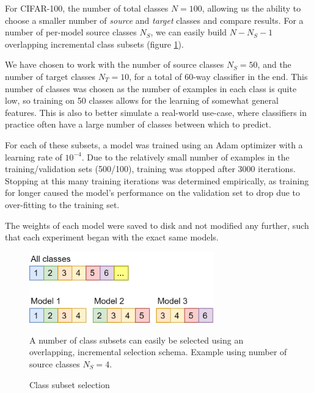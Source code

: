\documentclass{report}
\begin{document}
	For CIFAR-100, the number of total classes $N=100$, allowing us the ability to choose a smaller number of \emph{source} and \emph{target} classes and compare results. For a number of per-model source classes $N_S$, we can easily build $N-N_S-1$ overlapping incremental class subsets (figure \ref{fig:subsets:1}). \par
	We have chosen to work with the number of source classes $N_S = 50$, and the number of target classes $N_T = 10$, for a total of 60-way classifier in the end. This number of classes was chosen as the number of examples in each class is quite low, so training on 50 classes allows for the learning of somewhat general features. This is also to better simulate a real-world use-case, where classifiers in practice often have a large number of classes between which to predict. \par
	For each of these subsets, a model was trained using an Adam optimizer with a learning rate of $10^{-4}$. Due to the relatively small number of examples in the training/validation sets (500/100), training was stopped after 3000 iterations. Stopping at this many training iterations was determined empirically, as training for longer caused the model's performance on the validation set to drop due to over-fitting to the training set. \par
	The weights of each model were saved to disk and not modified any further, such that each experiment began with the exact same models. \par
	\begin{figure}[h]
		\centering
		\includegraphics[width=8cm]{modelsubsets}
		\caption{Class subset selection}
		A number of class subsets can easily be selected using an overlapping, incremental selection schema. Example using number of source classes $N_S = 4$.
		\label{fig:subsets:1}
	\end{figure}
\end{document}
